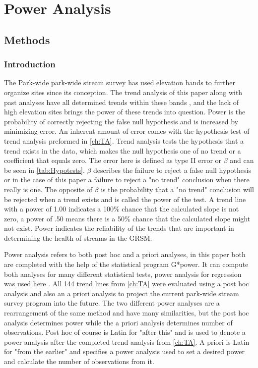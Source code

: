\chapter{Power Analysis} \label{ch:poweranslysis}

\section{Methods}

\subsection{Introduction}

The Park-wide park-wide stream survey has used elevation bands to further organize sites since its conception.
The trend analysis of this paper along with past analyses have all determined trends within these bands , and the lack of high elevation sites brings the power of these trends into question.
Power is the probability of correctly rejecting the false null hypothesis and is increased by minimizing error.
An inherent amount of error comes with the hypothesis test of trend analysis preformed in \autoref{ch:TA}.
Trend analysis tests the hypothesis that a trend exists in the data, which makes the null hypothesis one of no trend or a coefficient that equals zero.
The error here is defined as type II error or $\beta$ and can be seen in \autoref{tab:Hypotests}.
$\beta$ describes the failure to reject a false null hypothesis or in the case of this paper a failure to reject a "no trend" conclusion when there really is one.
The opposite of $\beta$ is the probability that a "no trend" conclusion will be rejected when a trend exists and is called the power of the test.
A trend line with a power of 1.00 indicates a 100$\%$ chance that the calculated slope is not zero, a power of .50 means there is a 50$\%$ chance that the calculated slope might not exist.
Power indicates the reliability of the trends that are important in determining the health of streams in the GRSM.



Power analysis refers to both  post hoc and a priori analyses, in this paper both are completed with the help of the statistical program G*power.
It can compute both analyses for many different statistical tests, power analysis for regression was used here \citep{faul2009statistical}.
All 144 trend lines from \autoref{ch:TA} were evaluated using a post hoc analysis and also an a priori analysis to project the current park-wide stream survey program into the future.
The two different power analyses are a rearrangement of the same method and have many similarities, but the post hoc analysis determines power while the a priori analysis determines number of observations.
Post hoc of course is Latin for "after this" and is used to denote a power analysis after the completed trend analysis from \autoref{ch:TA}.
A priori is Latin for "from the earlier" and specifies a power analysis used to set a desired power and calculate the number of observations from it.

